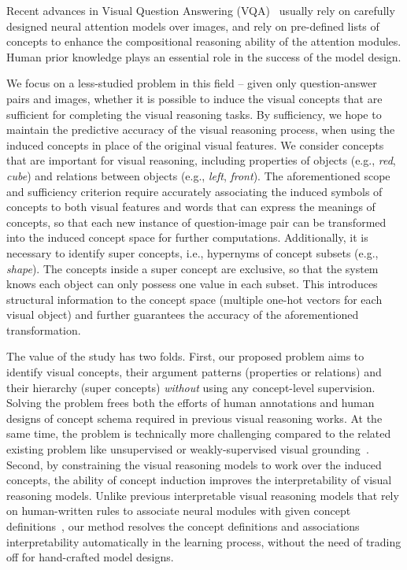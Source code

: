 \documentclass[final]{cvpr}
\begin{document}
Recent advances in Visual Question Answering (VQA)~\cite{anderson2018bottom, perez2018film,hudson2018compositional, andreas2016neural, hu2017learning, johnson2017inferring, hu2018explainable, yi2018neural, mao2018neuro} usually rely on carefully designed neural attention models over images, and rely on pre-defined lists of concepts to enhance the compositional reasoning ability of the attention modules.
Human prior knowledge plays an essential role in the success of the model design.

We focus on a less-studied problem in this field -- given only question-answer pairs and images, whether it is possible to induce the visual concepts that are sufficient for completing the visual reasoning tasks. 
By sufficiency, we hope to maintain the predictive accuracy of the visual reasoning process, when using the induced concepts in place of the original visual features.
We consider concepts that are important for visual reasoning, including properties of objects (e.g., \emph{red}, \emph{cube}) and relations between objects (e.g., \emph{left}, \emph{front}).
The aforementioned scope and sufficiency criterion require accurately associating the induced symbols of concepts to both visual features and words that can express the meanings of concepts, so that each new instance of question-image pair can be transformed into the induced concept space for further computations.
Additionally, it is necessary to identify super concepts, i.e., hypernyms of concept subsets (e.g., \emph{shape}). The concepts inside a super concept are exclusive, so that the system knows each object can only possess one value in each subset.
This introduces structural information to the concept space (multiple one-hot vectors for each visual object) and further guarantees the accuracy of the aforementioned transformation.

The value of the study has two folds.
First, our proposed problem aims to identify visual concepts, their argument patterns (properties or relations) and their hierarchy (super concepts) \emph{without} using any concept-level supervision. Solving the problem frees both the efforts of human annotations and human designs of concept schema required in previous visual reasoning works. At the same time, the problem is technically more challenging compared to the related existing problem like unsupervised or weakly-supervised visual grounding~\cite{yeh2018unsupervised}.
Second, by constraining the visual reasoning models to work over the induced concepts, the ability of concept induction improves the interpretability of visual reasoning models.
Unlike previous interpretable visual reasoning models that rely on human-written rules to associate neural modules with given concept definitions~\cite{hu2018explainable,mao2018neuro,shi2019explainable}, our method resolves the concept definitions and associations interpretability automatically in the learning process, without the need of trading off for hand-crafted model designs.
\end{document}
